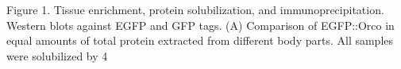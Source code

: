 Figure 1. Tissue enrichment, protein solubilization, and immunoprecipitation. Western blots against EGFP and GFP tags. (A) Comparison of EGFP::Orco in equal amounts of total protein extracted from different body parts. All samples were solubilized by 4%